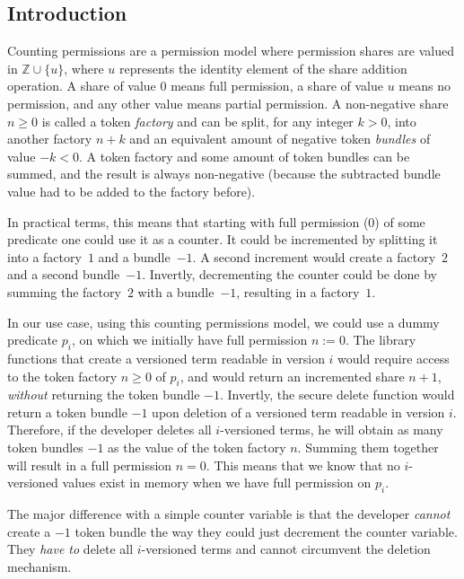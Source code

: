 \subsection{Introduction}
\label{sec:counting-permissions-introduction}

Counting permissions are a permission model where permission shares are valued in $\mathbb{Z}\cup\{u\}$, where $u$ represents the identity element of the share addition operation. A share of value $0$ means full permission, a share of value $u$ means no permission, and any other value means partial permission. A non-negative share $n\geq0$ is called a token \emph{factory} and can be split, for any integer $k>0$, into another factory $n+k$ and an equivalent amount of negative token \emph{bundles} of value $-k<0$. A token factory and some amount of token bundles can be summed, and the result is always non-negative (because the subtracted bundle value had to be added to the factory before). 

In practical terms, this means that starting with full permission ($0$) of some predicate one could use it as a counter. It could be incremented by splitting it into a factory~$1$ and a bundle~$-1$. A second increment would create a factory~$2$ and a second bundle~$-1$. Invertly, decrementing the counter could be done by summing the factory~$2$ with a bundle~$-1$, resulting in a factory~$1$.

In our use case, using this counting permissions model, we could use a dummy predicate $p_i$, on which we initially have full permission $n:=0$. The library functions that create a versioned term readable in version $i$ would require access to the token factory $n\geq0$ of $p_i$, and would return an incremented share $n+1$, \emph{without} returning the token bundle $-1$. Invertly, the secure delete function would return a token bundle $-1$ upon deletion of a versioned term readable in version $i$. Therefore, if the developer deletes all $i$-versioned terms, he will obtain as many token bundles $-1$ as the value of the token factory $n$. Summing them together will result in a full permission $n = 0$. This means that we know that no $i$-versioned values exist in memory when we have full permission on $p_i$.

The major difference with a simple counter variable is that the developer \emph{cannot} create a $-1$ token bundle the way they could just decrement the counter variable. They \emph{have to} delete all $i$-versioned terms and cannot circumvent the deletion mechanism.

